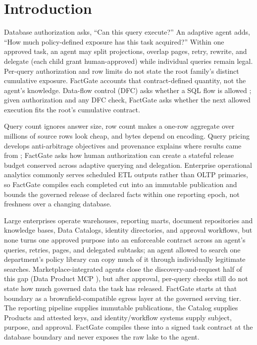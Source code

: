 \documentclass[10pt,journal,compsoc]{IEEEtran}
\providecommand{\IEEEPARstart}[2]{#1#2}
\newcommand{\system}{FactGate\xspace}
\begin{document}
\section{Introduction}
\label{sec:introduction}

\IEEEPARstart{D}{atabase} authorization asks, ``Can this query execute?''
An adaptive agent adds, ``How much policy-defined exposure has this task
acquired?'' Within one approved task, an agent may split projections,
overlap pages, retry, rewrite, and delegate (each child grant
human-approved) while individual queries remain legal. Per-query
authorization and row limits do not state the root family's distinct
cumulative exposure. \system accounts that contract-defined quantity, not the
agent's knowledge. Data-flow control (DFC) asks whether a SQL flow is
allowed \cite{summers2026dataflow,summers2026passant}; given
authorization and any DFC check, \system asks whether the next allowed execution
fits the root's cumulative contract.

Query count ignores answer size, row count makes a one-row aggregate over
millions of source rows look cheap, and bytes depend on encoding. Query
pricing develops anti-arbitrage objectives
\cite{koutris2012query,deep2017qirana,peng2025aria} and provenance explains
where results came from \cite{green2007provenance,amsterdamer2011aggregate};
\system asks how human authorization can create a stateful release
budget conserved across adaptive querying and delegation. Enterprise
operational analytics commonly serves scheduled ETL outputs rather than
OLTP primaries, so \system compiles each completed cut into an immutable
publication and bounds the governed release of declared facts within one
reporting epoch, not freshness over a changing database.

Large enterprises operate warehouses, reporting marts, document
repositories and knowledge bases, Data Catalogs, identity directories, and
approval workflows, but none turns one approved purpose into an enforceable
contract across an agent's queries, retries, pages, and delegated subtasks;
an agent allowed to search one department's policy library can copy much of
it through individually legitimate searches. Marketplace-integrated agents close the discovery-and-request half of this
gap (Data Product MCP
\cite{tonnarelli2026dataproductmcp,dietz2025automating,bitol2025odcs}), but
after approval, per-query checks still do not state how much
governed data the task has released. \system starts at that boundary
as a brownfield-compatible egress layer at the governed serving tier.
The reporting pipeline supplies immutable publications, the Catalog
supplies Products and attested keys, and identity/workflow
systems supply subject, purpose, and approval. \system compiles these into a
signed task contract at the database boundary and never exposes the raw lake
to the agent.
\end{document}
